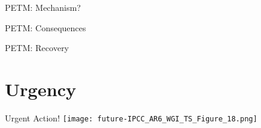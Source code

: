 \documentclass[aspectratio=169]{beamer}
\begin{document}
\begin{frame}{PETM: Mechanism?}

\end{frame}

\begin{frame}{PETM: Consequences}

\end{frame}

\begin{frame}{PETM: Recovery}

\end{frame}

\section{Urgency}

\begin{frame}{Urgent Action!}
    \centering
    \texttt{[image: future-IPCC\_AR6\_WGI\_TS\_Figure\_18.png]}
\end{frame}
\end{document}
